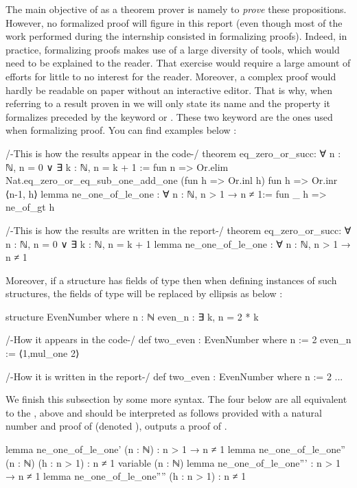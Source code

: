 The main objective of \Lean as a theorem prover is namely to \emph{prove} these propositions. However, no formalized proof will figure in this report (even though most of the work performed during the internship consisted in formalizing proofs). Indeed, in practice, formalizing proofs makes use of a large diversity of tools, which would need to be explained to the reader. That exercise would require a large amount of efforts for little to no interest for the reader. Moreover, a complex \Lean proof would hardly be readable on paper without an interactive editor. That is why, when referring to a result proven in \Lean we will only state its name and the property it formalizes preceded by the keyword  or . These two keyword are the ones used when formalizing proof. You can find examples below :

\begin{leancode}
/-This is how the results appear in the code-/
theorem eq_zero_or_succ: ∀ n : ℕ, n = 0 ∨ ∃ k : ℕ, n = k + 1 := 
  fun n => Or.elim Nat.eq_zero_or_eq_sub_one_add_one  
    (fun h => Or.inl h) fun h => Or.inr ⟨n-1, h⟩
lemma ne_one_of_le_one : ∀ n : ℕ, n > 1 → n ≠ 1:= fun _ h => ne_of_gt h

/-This is how the results are written in the report-/
theorem eq_zero_or_succ: ∀ n : ℕ, n = 0 ∨ ∃ k : ℕ, n = k + 1
lemma ne_one_of_le_one : ∀ n : ℕ, n > 1 → n ≠ 1
\end{leancode}

Moreover, if a structure has fields of type  then when defining instances of such structures, the fields of type  will be replaced by ellipsis as below :
\begin{leancode}
structure EvenNumber where 
  n : ℕ
  even_n : ∃ k, n = 2 * k

/-How it appears in the code-/
def two_even : EvenNumber where
 n := 2
 even_n := ⟨1,mul_one 2⟩

/-How it is written in the report-/
def two_even : EvenNumber where
  n := 2
  ...
\end{leancode}

We finish this subsection by some more syntax. The four  below are all equivalent to the ,  above and should be interpreted as follows provided with a natural number  and proof  of  (denoted ),  outputs a proof of .
\begin{leancode}
lemma ne_one_of_le_one' (n : ℕ) : n > 1 → n ≠ 1
lemma ne_one_of_le_one'' (n : ℕ) (h : n > 1) : n ≠ 1
variable (n : ℕ)
lemma ne_one_of_le_one''' :  n > 1 → n ≠ 1
lemma ne_one_of_le_one''''  (h : n > 1) : n ≠ 1
\end{leancode}

